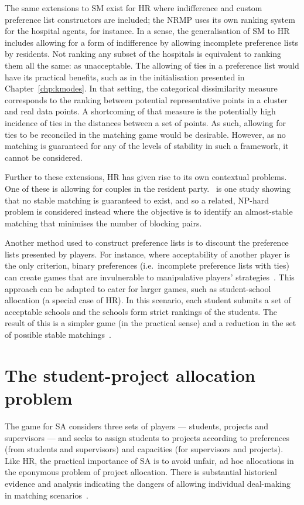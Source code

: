 The same extensions to SM exist for HR where indifference and custom preference
list constructors are included; the NRMP uses its own ranking system for the
hospital agents, for instance. In a sense, the generalisation of SM to HR
includes allowing for a form of indifference by allowing incomplete preference
lists by residents. Not ranking any subset of the hospitals is equivalent to
ranking them all the same: as unacceptable. The allowing of ties in a preference
list would have its practical benefits, such as in the initialisation presented
in Chapter~\ref{chp:kmodes}. In that setting, the categorical dissimilarity
measure corresponds to the ranking between potential representative points in a
cluster and real data points. A shortcoming of that measure is the potentially
high incidence of ties in the distances between a set of points. As such,
allowing for ties to be reconciled in the matching game would be desirable.
However, as no matching is guaranteed for any of the levels of stability in such
a framework, it cannot be considered.

Further to these extensions, HR has given rise to its own contextual problems.
One of these is allowing for couples in the resident party.~\cite{Manlove2016}
is one study showing that no stable matching is guaranteed to exist, and so a
related, NP-hard problem is considered instead where the objective is to
identify an almost-stable matching that minimises the number of blocking pairs.

Another method used to construct preference lists is to discount the preference
lists presented by players. For instance, where acceptability of another player
is the only criterion, binary preferences (i.e.\ incomplete preference lists
with ties) can create games that are invulnerable to manipulative players'
strategies~\cite{Bogomolnaia2004}. This approach can be adapted to cater for
larger games, such as student-school allocation (a special case of HR). In this
scenario, each student submits a set of acceptable schools and the schools form
strict rankings of the students. The result of this is a simpler game (in the
practical sense) and a reduction in the set of possible stable
matchings~\cite{Haeringer2014,Haeringer2019}.


\section{The student-project allocation problem}

The game for SA considers three sets of players --- students, projects and
supervisors --- and seeks to assign students to projects according to
preferences (from students and supervisors) and capacities (for supervisors and
projects). Like HR, the practical importance of SA is to avoid unfair, ad hoc
allocations in the eponymous problem of project allocation. There is substantial
historical evidence and analysis indicating the dangers of allowing individual
deal-making in matching scenarios~\cite{Gusfield1989,Roth1992}.

